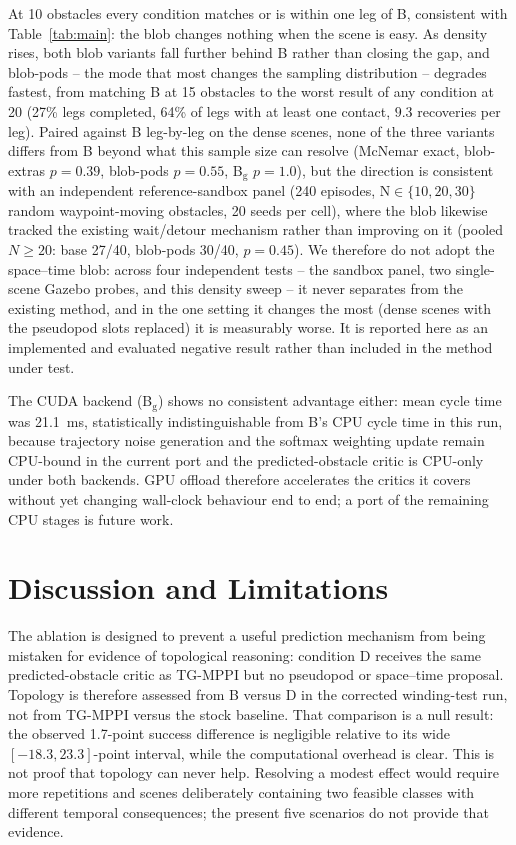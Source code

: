 \documentclass[journal]{IEEEtran}
\begin{document}
At 10 obstacles every condition matches or is within one leg of B, consistent
with Table~\ref{tab:main}: the blob changes nothing when the scene is easy.
As density rises, both blob variants fall further behind B rather than
closing the gap, and blob-pods -- the mode that most changes the sampling
distribution -- degrades fastest, from matching B at 15 obstacles to the
worst result of any condition at 20 (27\% legs completed, 64\% of legs with
at least one contact, $9.3$ recoveries per leg). Paired against B leg-by-leg
on the dense scenes, none of the three variants differs from B beyond what
this sample size can resolve (McNemar exact, blob-extras $p=0.39$, blob-pods
$p=0.55$, B$_{\mathrm g}$ $p=1.0$), but the direction is consistent with an
independent reference-sandbox panel (240 episodes, N$\in\{10,20,30\}$ random
waypoint-moving obstacles, 20 seeds per cell), where the blob likewise
tracked the existing wait/detour mechanism rather than improving on it
(pooled $N{\ge}20$: base 27/40, blob-pods 30/40, $p=0.45$). We therefore do
not adopt the space--time blob: across four independent tests -- the sandbox
panel, two single-scene Gazebo probes, and this density sweep -- it never
separates from the existing method, and in the one setting it changes the
most (dense scenes with the pseudopod slots replaced) it is measurably worse.
It is reported here as an implemented and evaluated negative result rather
than included in the method under test.

The CUDA backend (B$_{\mathrm g}$) shows no consistent advantage either: mean
cycle time was \SI{21.1}{\milli\second}, statistically indistinguishable from
B's CPU cycle time in this run, because trajectory noise generation and the
softmax weighting update remain CPU-bound in the current port and the
predicted-obstacle critic is CPU-only under both backends. GPU offload
therefore accelerates the critics it covers without yet changing wall-clock
behaviour end to end; a port of the remaining CPU stages is future work.

\section{Discussion and Limitations}
\label{sec:discussion}
The ablation is designed to prevent a useful prediction mechanism from being
mistaken for evidence of topological reasoning: condition D receives the same
predicted-obstacle critic as TG-MPPI but no pseudopod or space--time proposal.
Topology is therefore assessed from B versus D in the corrected winding-test
run, not from TG-MPPI versus the stock baseline. That comparison is a null
result: the observed 1.7-point success difference is negligible relative to its
wide $[-18.3,23.3]$-point interval, while the computational overhead is clear.
This is not proof that topology can never help. Resolving a modest effect would
require more repetitions and scenes deliberately containing two feasible
classes with different temporal consequences; the present five scenarios do
not provide that evidence.
\end{document}
